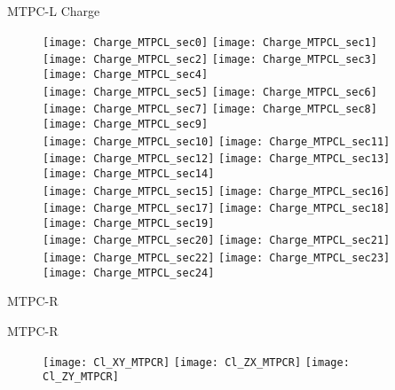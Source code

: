 \documentclass[11pt]{beamer}
\begin{document}
\begin{frame}{MTPC-L Charge}
\begin{figure}
\texttt{[image: Charge\_MTPCL\_sec0]}
\texttt{[image: Charge\_MTPCL\_sec1]}
\texttt{[image: Charge\_MTPCL\_sec2]}
\texttt{[image: Charge\_MTPCL\_sec3]}
\texttt{[image: Charge\_MTPCL\_sec4]}\\
\texttt{[image: Charge\_MTPCL\_sec5]}
\texttt{[image: Charge\_MTPCL\_sec6]}
\texttt{[image: Charge\_MTPCL\_sec7]}
\texttt{[image: Charge\_MTPCL\_sec8]}
\texttt{[image: Charge\_MTPCL\_sec9]}\\
\texttt{[image: Charge\_MTPCL\_sec10]}
\texttt{[image: Charge\_MTPCL\_sec11]}
\texttt{[image: Charge\_MTPCL\_sec12]}
\texttt{[image: Charge\_MTPCL\_sec13]}
\texttt{[image: Charge\_MTPCL\_sec14]}\\
\texttt{[image: Charge\_MTPCL\_sec15]}
\texttt{[image: Charge\_MTPCL\_sec16]}
\texttt{[image: Charge\_MTPCL\_sec17]}
\texttt{[image: Charge\_MTPCL\_sec18]}
\texttt{[image: Charge\_MTPCL\_sec19]}\\
\texttt{[image: Charge\_MTPCL\_sec20]}
\texttt{[image: Charge\_MTPCL\_sec21]}
\texttt{[image: Charge\_MTPCL\_sec22]}
\texttt{[image: Charge\_MTPCL\_sec23]}
\texttt{[image: Charge\_MTPCL\_sec24]}
\end{figure}
\end{frame}

\begin{frame}
\centering
\Huge
MTPC-R
\end{frame}

\begin{frame}{MTPC-R}
\begin{figure}
\texttt{[image: Cl\_XY\_MTPCR]}
\texttt{[image: Cl\_ZX\_MTPCR]}
\texttt{[image: Cl\_ZY\_MTPCR]}
\end{figure}
\end{frame}
\end{document}
